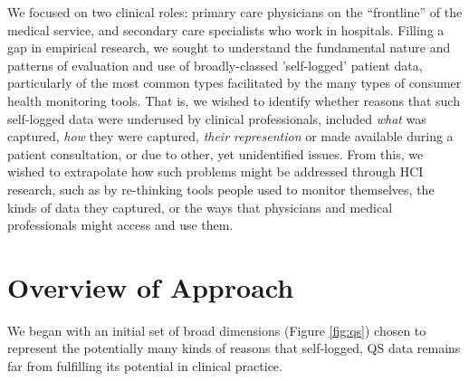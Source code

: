 \documentclass{sigchi}
\begin{document}
We focused on two clinical roles: primary care physicians on the ``frontline'' of the medical service, and secondary care specialists who work in hospitals.  Filling a gap in empirical research, we sought to understand the fundamental nature and patterns of evaluation and use of broadly-classed 'self-logged' patient data, particularly of the most common types facilitated by the many types of consumer health monitoring tools.  That is, we wished to identify whether reasons that such self-logged data were underused by clinical professionals, included \emph{what} was captured, \emph{how} they were  captured,  \emph{their represention} or made available during a patient consultation, or  due to other, yet unidentified issues.  From this, we wished to extrapolate how such problems might be addressed through HCI research, such as by re-thinking tools people used to monitor themselves, the kinds of data they captured, or the ways that physicians and medical professionals might access and use them.

\section{Overview of Approach}

We began with an initial set of broad dimensions (Figure \ref{fig:qs}) chosen to represent the potentially many kinds of reasons that self-logged, QS data remains far from fulfilling its potential in clinical practice.

\end{document}
